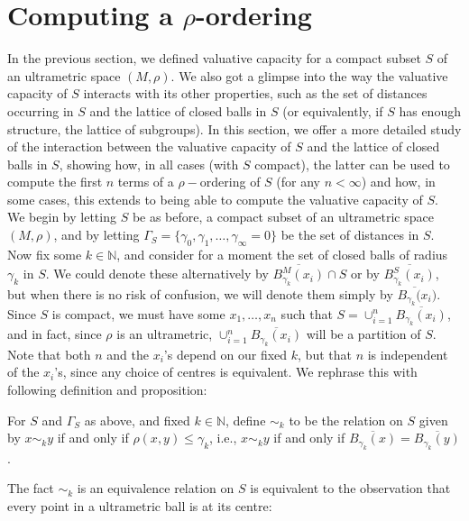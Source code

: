 

\newpage

\section*{Computing a $\rho$-ordering}
In the previous section, we defined valuative capacity for a compact subset $S$ of an ultrametric space $(M, \rho)$. We also got a glimpse into the way the valuative capacity of $S$ interacts with its other properties, such as the set of distances occurring in $S$ and the lattice of closed balls in $S$ (or equivalently, if $S$ has enough structure, the lattice of subgroups). In this section, we offer a more detailed study of the interaction between the valuative capacity of $S$ and the lattice of closed balls in $S$, showing how, in all cases (with $S$ compact), the latter can be used to compute the first $n$ terms of a $\rho-$ordering of $S$ (for any $n < \infty$) and how, in some cases, this extends to being able to compute the valuative capacity of $S$. \\

We begin by letting $S$ be as before,  a compact subset of an ultrametric space $(M, \rho)$, and by letting $\Gamma_S =\{\gamma_0, \gamma_1,\ldots,\gamma_\infty=0\}$ be the set of distances in $S$.  Now fix some $k \in \mathbb{N}$, and consider for a moment the set of closed balls of radius $\gamma_k$ in $S$. We could denote these alternatively by $\overline{B^M_{\gamma_k}(x_i)} \cap S$ or by  $\overline{B^S_{\gamma_k}(x_i)}$, but when there is no risk of confusion, we will denote them simply by $\overline{B_{\gamma_k}(x_i})$. Since $S$ is compact, we must have some $x_1,\ldots, x_n$  such that $S= \cup_{i=1}^n \overline{B_{\gamma_k}(x_i)}$, and in fact,  since $\rho$ is an ultrametric, $\cup_{i=1}^n \overline{B_{\gamma_k}(x_i)}$ will be a partition of $S$. Note that both $n$ and the $x_i$'s depend on our fixed $k$, but that $n$ is independent of the $x_i$'s, since any choice of centres is equivalent. We rephrase this with following definition and proposition:

\begin{definition*}
For $S$ and $\Gamma_S$ as above, and fixed $k \in \mathbb{N}$, define $\sim_k$ to  be the relation on $S$ given by $x \sim_k y$ if and only if $\rho(x,y) \leq \gamma_k$, i.e.,  $x \sim_k y$ if and only if $\overline{B_{\gamma_k}(x)} =\overline{B_{\gamma_k}(y)}$.
\end{definition*}

The fact $\sim_k$ is an equivalence relation on $S$ is equivalent to the observation that every point in a ultrametric ball is at its centre:

